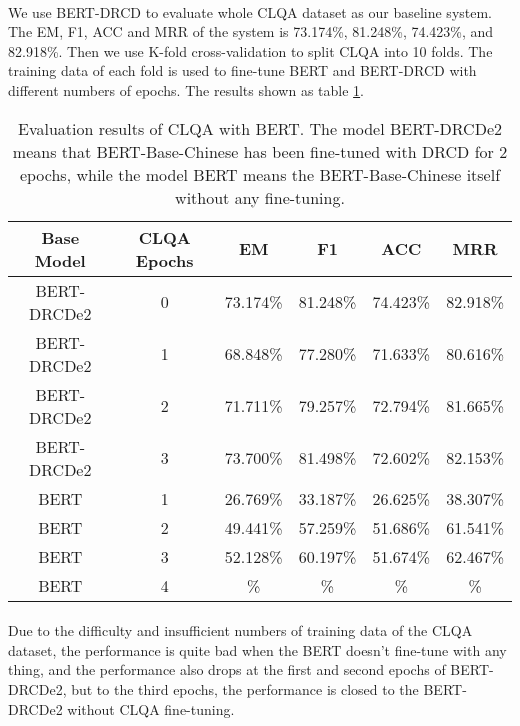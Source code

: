 \documentclass{article}
\begin{document}
\paragraph{}
We use BERT-DRCD to evaluate whole CLQA dataset as our baseline system. The EM, F1, ACC and MRR of the system is 73.174\%, 81.248\%, 74.423\%, and 82.918\%. Then we use K-fold cross-validation to split CLQA into 10 folds. The training data of each fold is used to fine-tune BERT and BERT-DRCD with different numbers of epochs. The results shown as table \ref{tab:bert-clqa}.

\begin{table}[h!]
  \centering
  \begin{tabular}{cccccc}
    Base Model & CLQA Epochs & EM & F1 & ACC & MRR\\
    \toprule
    BERT-DRCDe2 & 0 & 73.174\% & 81.248\% & 74.423\% & 82.918\% \\
    BERT-DRCDe2 & 1 & 68.848\% & 77.280\% & 71.633\% & 80.616\% \\
    BERT-DRCDe2 & 2 & 71.711\% & 79.257\% & 72.794\% & 81.665\% \\
    BERT-DRCDe2 & 3 & 73.700\% & 81.498\% & 72.602\% & 82.153\% \\
    BERT        & 1 & 26.769\% & 33.187\% & 26.625\% & 38.307\% \\
    BERT        & 2 & 49.441\% & 57.259\% & 51.686\% & 61.541\% \\
    BERT        & 3 & 52.128\% & 60.197\% & 51.674\% & 62.467\% \\
    BERT        & 4 & \% & \% & \% & \% \\
  \end{tabular}
  \caption{Evaluation results of CLQA with BERT. The model BERT-DRCDe2 means that BERT-Base-Chinese has been fine-tuned with DRCD for 2 epochs, while the model BERT means the BERT-Base-Chinese itself without any fine-tuning.}
  \label{tab:bert-clqa}
\end{table}

\paragraph{}
Due to the difficulty and insufficient numbers of training data of the CLQA dataset, the performance is quite bad when the BERT doesn't fine-tune with any thing, and the performance also drops at the first and second epochs of BERT-DRCDe2, but to the third epochs, the performance is closed to the BERT-DRCDe2 without CLQA fine-tuning.
\end{document}
